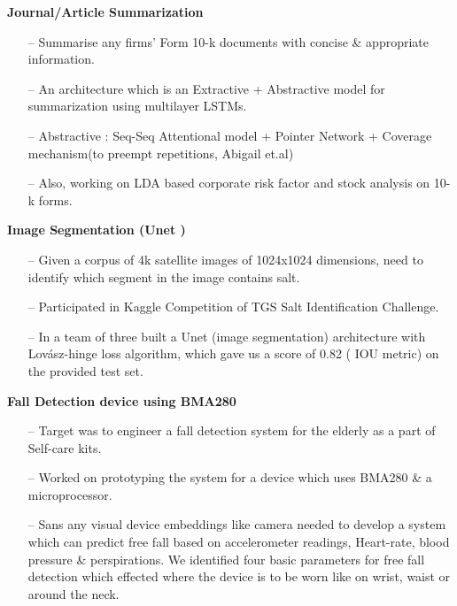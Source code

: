 \documentclass[margin,line]{templates/resume}
\newcommand{\myhref}[3][blue]{\href{#2}{\color{#1}{#3}}}
\newcommand{\compresslist}{%
\setlength{\itemsep}{3pt}%
\setlength{\parskip}{0pt}%
\setlength{\parsep}{0pt}%
}
\begin{document}
\begin{resume}
\vspace{-0.2cm}
\textsf{\textbf{Journal/Article Summarization}} \hfill{\myhref[darkblue]{https://esha-singh.github.io/\#mpi}{Web}}
\vspace{0.05cm}
\begin{itemize}[leftmargin=*]\compresslist
 \item[--] Summarise any firms' Form 10-k documents with concise \& appropriate information. 
\item[--]An architecture which is an Extractive + Abstractive model for summarization using multilayer LSTMs.
\item[--]Abstractive : Seq-Seq Attentional model + Pointer Network + Coverage mechanism(to preempt repetitions, Abigail et.al) 
\item[--]Also, working on LDA based corporate risk factor and stock analysis on 10-k forms.
\end{itemize}

\vspace{-0.2cm}    
\textsf{\textbf{Image Segmentation (Unet )}} \hfill{\myhref[darkblue]{https://esha-singh.github.io/\#mpi}{Web}}
\vspace{0.05cm}
\begin{itemize}[leftmargin=*]\compresslist
 \item[--]Given a corpus of 4k satellite images of 1024x1024 dimensions, need to identify which segment in the image contains salt.  
\item[--] Participated in Kaggle Competition of TGS Salt Identification Challenge.
\item[--] In a team of three built a Unet (image segmentation) architecture with Lovász-hinge loss algorithm, which gave us a score of 0.82 ( IOU metric) on the provided test set.
\end{itemize}

\vspace{-0.2cm}    
\textsf{\textbf{Fall Detection device using BMA280}} \hfill{\myhref[darkblue]{https://esha-singh.github.io/\#mpi}{Web}}
\vspace{0.05cm}
\begin{itemize}[leftmargin=*]\compresslist
\item[--]Target was to engineer a fall detection system for the elderly as a part of Self-care kits.
\item[--]Worked on prototyping the system for a device which uses BMA280 \& a microprocessor.
\item[--]Sans any visual device embeddings like camera needed to develop a system which can predict free fall based on accelerometer readings, Heart-rate, blood pressure \& perspirations. We identified four basic parameters for free fall detection which effected where the device is to be worn like on wrist, waist or around the neck.
\end{itemize}


\end{resume}
\end{document}
